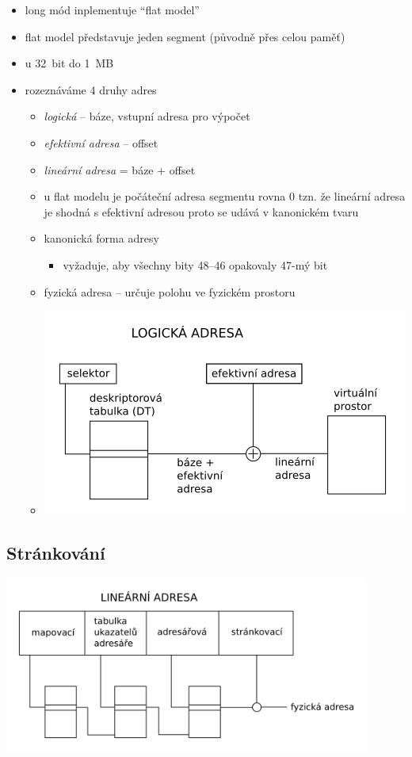 \documentclass[a4paper,12pt]{article}
\providecommand{\tightlist}{%
\setlength{\itemsep}{0pt}\setlength{\parskip}{0pt}}
\begin{document}
\begin{itemize}
\tightlist
\item long mód inplementuje ``flat model''
\item flat model představuje jeden segment (původně přes celou paměť)
\item u 32~bit do 1~MB
\item rozeznáváme 4 druhy adres

  \begin{itemize}
    \tightlist
  \item \emph{logická} -- báze, vstupní adresa pro výpočet
  \item \emph{efektivní adresa} -- offset
  \item \emph{lineární adresa} = báze + offset
  \item u flat modelu je počáteční adresa segmentu rovna 0 tzn. že lineární
    adresa je shodná s efektivní adresou proto se udává v kanonickém
    tvaru
  \item kanonická forma adresy

    \begin{itemize}
    \tightlist
    \item vyžaduje, aby všechny bity 48--46 opakovaly 47-mý bit
    \end{itemize}
  \item fyzická adresa -- určuje polohu ve fyzickém prostoru
  \item[] \includegraphics[width=11.904cm]{ref/logicka-adresa.png}
  \end{itemize}
\end{itemize}

\subsection{Stránkování}

\includegraphics[width=12cm]{ref/strankovani.png}
\end{document}
